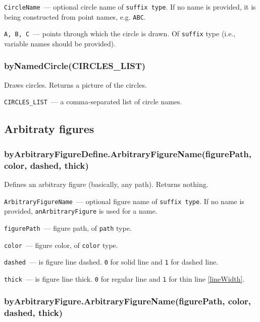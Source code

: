 	\texttt{CircleName}~— optional circle name of \texttt{suffix type}. If no name is provided, it is being constructed from point names, e.g. \texttt{ABC}.
	
	\texttt{A, B, C}~— points through which the circle is drawn. Of \texttt{suffix} type (i.e., variable names should be provided).


\subsubsection{byNamedCircle(CIRCLES\_LIST)}\label{byNamedCircle}
	
	Draws circles. Returns a picture of the circles.
	
	\texttt{CIRCLES\_LIST}~— a comma-separated list of circle names.

\subsection{Arbitraty figures}

\subsubsection{byArbitraryFigureDefine.ArbitraryFigureName(figurePath, color, dashed, thick)}\label{byArbitraryFigureDefine}
	
	Defines an arbitrary figure (basically, any path). Returns nothing.
	
	\texttt{ArbitraryFigureName}~— optional figure name of \texttt{suffix type}. If no name is provided, \texttt{anArbitraryFigure} is used for a name.
	
	\texttt{figurePath}~— figure path, of \texttt{path} type.
	
	\texttt{color}~— figure color, of \texttt{color} type.
	
	\texttt{dashed}~— is figure line dashed. \texttt{0} for solid line and \texttt{1} for dashed line.
	
	\texttt{thick}~— is figure line thick. \texttt{0} for regular line and \texttt{1} for thin line \ref{lineWidth}.

\subsubsection{byArbitraryFigure.ArbitraryFigureName(figurePath, color, dashed, thick)}\label{byArbitraryFigure}


